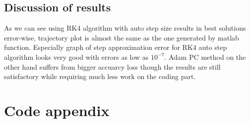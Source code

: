 \section{Discussion of results}
As we can see using RK4 algorithm with auto step size results in best solutions error-wise, trajectory plot is almost the same as the one generated by matlab function. Especially graph of step approximation error for RK4 auto step algorithm looks very good with errors as low as $10^{-7}$. Adam PC method on the other hand suffers from bigger accuarcy loss though the results are still satisfactory while requiring much less work on the coding part.

\chapter{Code appendix}

